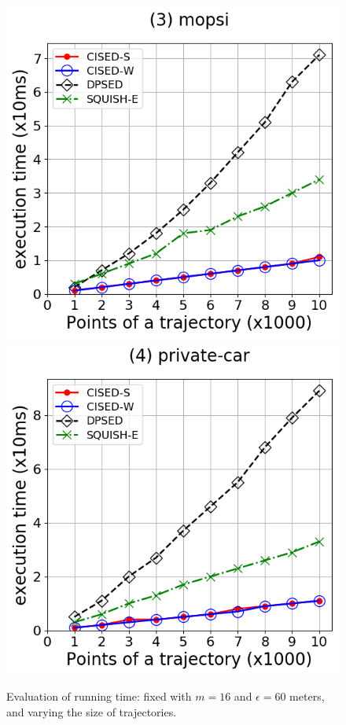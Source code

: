 \begin{figure}[tb!]
\includegraphics[scale = 0.30]{Figures/Exp-time-size-mopsi.png}
\includegraphics[scale = 0.30]{Figures/Exp-time-size-private.png}
\caption{\small Evaluation of running time: fixed with $m=16$ and $\epsilon=60$ meters, and varying the size of trajectories. }
\label{fig:time-size}
\end{figure}





